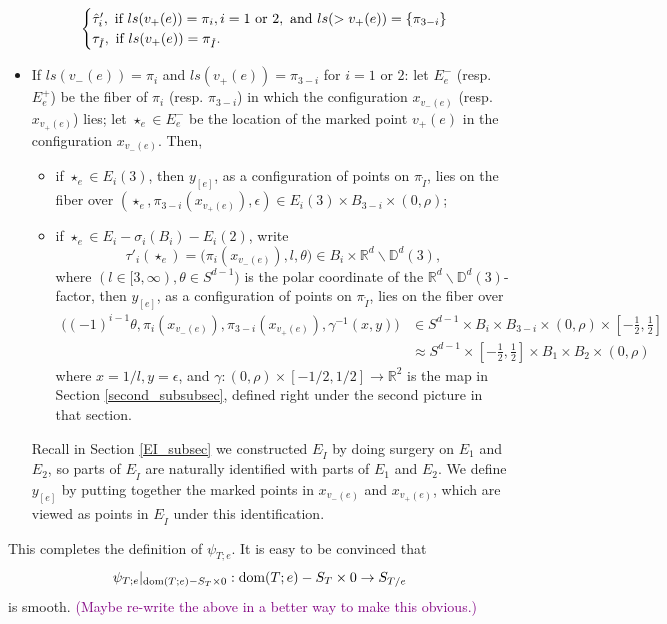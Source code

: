 \documentclass[11pt]{article}
\theoremstyle{definition}
\theoremstyle{remark}
\def\R{\mathbb{R}}
\def\D{\mathbb{D}}
\def\rI{{\mathring{I}}}
\def\cmt#1{\textcolor{purple}{(#1)}}
\def\tn#1{\textnormal{#1}}
\begin{document}
\begin{itemize}
$$\begin{cases}
\hat\tau'_i, \tn{ if }ls(v_+(e))=\pi_i, i=1 \tn{ or } 2, \tn{ and } ls(>v_+(e))=\{\pi_{3-i}\} \\
\tau_\rI, \tn{ if }ls(v_+(e))=\pi_\rI. 
\end{cases}$$
\item  If $ls(v_-(e))=\pi_{i}$ and $ls(v_+(e))=\pi_{3-i}$ for  $i=1$ or $2$:  
let $E^-_e$ (resp. $E^+_e$) be the fiber of $\pi_{i}$ (resp. $\pi_{3-i}$) in which the configuration $x_{v_-(e)}$ (resp. $x_{v_+(e)}$) lies; 
let $\star_e\in E_e^-$ be the location of the marked point $v_+(e)$ in the configuration $x_{v_-(e)}$. 
Then, 
\begin{itemize}
\item if $\star_e\in E_{i}(3)$, 
then $y_{[e]}$, as a configuration of points on $\pi_\rI$, lies on the fiber over
$(\star_e,\pi_{3-i}(x_{v_+(e)}),\epsilon)\in E_i(3)\times B_{3-i}\times(0,\rho)$; 
\item if $\star_e\in E_{i}-\sigma_{i}(B_i)-E_{i}(2)$,  
write 
$$\tau'_i(\star_e)=\big(\pi_i(x_{v_-(e)}),l,\theta\big)\in B_i\times \R^d\backslash\D^d(3),$$
where $(l\in[3,\infty), \theta\in S^{d-1})$ is the polar coordinate of the $\R^d\backslash\D^d(3)$-factor,
then $y_{[e]}$, as a configuration of points on $\pi_\rI$, lies on the fiber over
\begin{align*}
\big((-1)^{i-1}\theta,\pi_i(x_{v_-(e)}),\pi_{3-i}(x_{v_+(e)}),\gamma^{-1}(x,y)\big)&\in S^{d-1}\times B_i\times B_{3-i}\times(0,\rho)\times[-\frac{1}{2},\frac{1}{2}]\\
&%
{\approx} S^{d-1}\times[-\frac{1}{2},\frac{1}{2}]\times B_1\times B_{2}\times(0,\rho)
\end{align*}
where $x=1/l, y=\epsilon$, and
$\gamma:(0,\rho)\times[-1/2,1/2]\to\R^2$ is the map in Section \ref{second_subsubsec}, defined right under the second picture in that section. 
\end{itemize}
Recall in Section \ref{EI_subsec} we constructed $E_\rI$ by doing surgery on $E_1$ and $E_2$, so parts of $E_\rI$ are naturally identified with parts of $E_1$ and $E_2$.
We define $y_{[e]}$ by putting together the marked points in $x_{v_-(e)}$ and $x_{v_+(e)}$, which are viewed as points in $E_\rI$ under this identification. 
\end{itemize}

This completes the definition of $\psi_{T;e}$. 
It is easy to be convinced that  $$\psi_{T;e}|_{\tn{dom}(T;e)-S_T\times0}:\tn{dom}(T;e)-S_T\times0\to S_{T/e}$$
is smooth. 
\cmt{Maybe re-write the above in a better way to make this obvious.}
\end{document}
